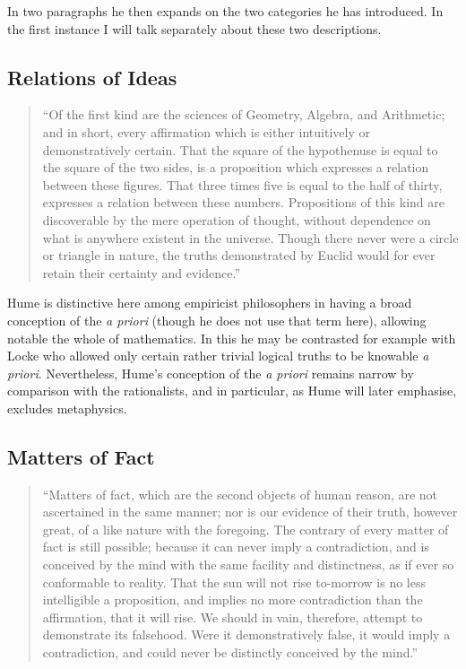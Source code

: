 In two paragraphs he then expands on the two categories he has introduced.
In the first instance I will talk separately about these two descriptions.

\subsection{Relations of Ideas}

\begin{quote}
``Of the first kind are the sciences of Geometry, Algebra, and
Arithmetic; and in short, every affirmation which is either
intuitively or demonstratively certain.
That the square of the hypothenuse is equal to the square of the two
sides, is a proposition which expresses a relation between these
figures.
That three times five is equal to the half of thirty, expresses a
relation between these numbers.
Propositions of this kind are discoverable by the mere operation of
thought, without dependence on what is anywhere existent in the
universe.
Though there never were a circle or triangle in nature, the truths
demonstrated by Euclid would for ever retain their certainty and
evidence.''
\end{quote}

Hume is distinctive here among empiricist philosophers in having a
broad conception of the \emph{a priori} (though he does not use that
term here), allowing notable the whole of mathematics.
In this he may be contrasted for example with Locke who allowed
only certain rather trivial logical truths to be knowable \emph{a
  priori}.
Nevertheless, Hume's conception of the \emph{a priori} remains narrow
by comparison with the rationalists, and in particular, as Hume will
later emphasise, excludes metaphysics.

\subsection{Matters of Fact}

\begin{quote}
``Matters of fact, which are the second objects of human reason, are not ascertained in the same manner; nor is our evidence of their truth, however great, of a like nature with the foregoing. The contrary of every matter of fact is still possible; because it can never imply a contradiction, and is conceived by the mind with the same facility and distinctness, as if ever so conformable to reality. That the sun will not rise to-morrow is no less intelligible a proposition, and implies no more contradiction than the affirmation, that it will rise. We should in vain, therefore, attempt to demonstrate its falsehood. Were it demonstratively false, it would imply a contradiction, and could never be distinctly conceived by the mind.''
\end{quote}

